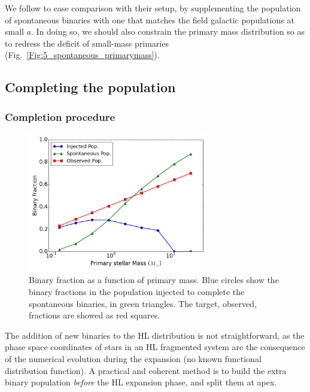 We follow \cite{Parker2014} to ease comparison with their setup, by supplementing the population of spontaneous binaries with one that matches the field galactic populations at small $a$. 
In doing so, we should also constrain the primary mass distribution so as to redress the deficit of small-mass primaries (Fig.~\ref{Fig:5_spontaneous_primarymass}).



\subsection{Completing the population}
\label{Sec:Completing}

\subsubsection*{Completion procedure}


\begin{figure}
\begin{center}
\includegraphics[width=0.7\textwidth]{Figures/5_injected_fraction}
\caption{Binary fraction as a function of primary mass. Blue circles show the binary fractions in the population injected to complete the spontaneous binaries, in green triangles. The target, observed, fractions are showed as red squares. }
\label{Fig:5_injected}
\end{center}
\end{figure}

The addition of new binaries to the HL distribution is not straightforward, as the phase space coordinates of stars in an HL fragmented system are the consequence of the numerical evolution during the expansion (no known functional distribution function). A practical and coherent method is to build the extra binary population \textit{before} the HL expansion phase, and split them at apex.

